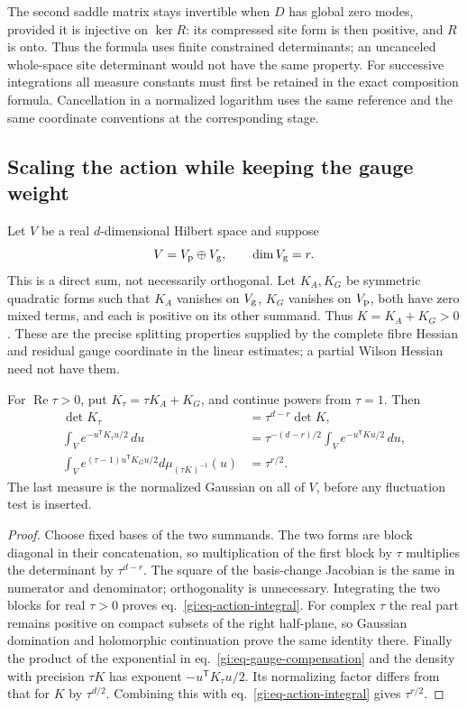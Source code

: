 \documentclass[11pt,letterpaper,reqno]{amsart}
\makeatletter
\numberwithin{equation}{section}
\renewcommand{\eqref}[1]{\textup{eq.~\ref{#1}}}
\theoremstyle{definition}
\newcommand{\ms@minorstart}{%
  \pushQED{\qed}\renewcommand{\qedsymbol}{$\blacksquare$}}
\newenvironment{proposition}[1][]{\ms@minorstart\ms@proposition[#1]}
  {\popQED\endms@proposition}
\theoremstyle{remark}
\makeatother
\begin{document}
The second saddle matrix stays invertible when $D$ has
global zero modes, provided it is injective on $\ker R$:
its compressed site form is then positive, and $R$ is
onto. Thus the formula uses finite constrained
determinants; an uncanceled whole-space site determinant
would not have the same property. For successive
integrations all measure constants must first be
retained in the exact composition formula. Cancellation
in a normalized logarithm uses the same reference and
the same coordinate conventions at the corresponding
stage.

\subsection{Scaling the action while keeping the gauge weight}

Let $V$ be a real $d$-dimensional Hilbert space and suppose
\[
 V=V_{\rm p}\oplus V_{\rm g},\qquad \dim V_{\rm g}=r.
\]
This is a direct sum, not necessarily orthogonal. Let
$K_A,K_G$ be symmetric quadratic forms such that $K_A$
vanishes on $V_{\rm g}$, $K_G$ vanishes on $V_{\rm p}$,
both have zero mixed terms, and each is positive on its
other summand. Thus $K=K_A+K_G>0$. These are the precise
splitting properties supplied by the complete fibre
Hessian and residual gauge coordinate in the linear
estimates; a partial Wilson Hessian need not have them.

\begin{proposition}[The two action-weight powers]
\label{gi:prop-action-gauge-powers}
For $\operatorname{Re}\tau>0$, put $K_\tau=\tau K_A+K_G$,
and continue powers from $\tau=1$. Then
\begin{align}
 \det K_\tau&=\tau^{d-r}\det K,\label{gi:eq-action-determinant}\\
 \int_Ve^{-u^{\mathsf T}K_\tau u/2}\,du
    &=\tau^{-(d-r)/2}\int_Ve^{-u^{\mathsf T}Ku/2}\,du,
       \label{gi:eq-action-integral}\\
 \int_V e^{(\tau-1)u^{\mathsf T}K_Gu/2}
                         d\mu_{(\tau K)^{-1}}(u)
    &=\tau^{r/2}.
       \label{gi:eq-gauge-compensation}
\end{align}
The last measure is the normalized Gaussian on all of $V$,
before any fluctuation test is inserted.
\end{proposition}

\begin{proof}
Choose fixed bases of the two summands. The two forms are
block diagonal in their concatenation, so multiplication
of the first block by $\tau$ multiplies the determinant
by $\tau^{d-r}$. The square of the basis-change Jacobian
is the same in numerator and denominator; orthogonality
is unnecessary. Integrating the two blocks for real
$\tau>0$ proves \eqref{gi:eq-action-integral}. For complex
$\tau$ the real part remains positive on compact subsets
of the right half-plane, so Gaussian domination and
holomorphic continuation prove the same identity there.
Finally the product of the exponential in
\eqref{gi:eq-gauge-compensation} and the density with
precision $\tau K$ has exponent $-u^{\mathsf T}K_\tau u/2$.
Its normalizing factor differs from that for $K$ by
$\tau^{d/2}$. Combining this with
\eqref{gi:eq-action-integral} gives $\tau^{r/2}$.
\end{proof}
\end{document}
